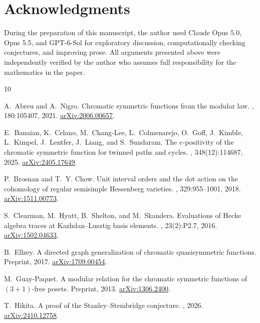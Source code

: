\documentclass[12pt]{article}
\theoremstyle{plain}
\theoremstyle{definition}
\theoremstyle{remark}
\begin{document}
\section{Acknowledgments}
During the preparation of this manuscript, the author used Claude Opus 5.0, Opus 5.5, and GPT-6-Sol for exploratory discussion, computationally checking conjectures, and improving prose. All arguments presented above were independently verified by the author who assumes full responsibility for the mathematics in the paper.
\begin{thebibliography}{10}

A.~Abreu and A.~Nigro.
\newblock Chromatic symmetric functions from the modular law.
, 180:105407, 2021.
\newblock \href{https://arxiv.org/abs/2006.00657}{arXiv:2006.00657}.

E.~Banaian, K.~Celano, M.~Chang-Lee, L.~Colmenarejo, O.~Goff, J.~Kimble, L.~Kimpel, J.~Lentfer, J.~Liang, and S.~Sundaram.
\newblock The $e$-positivity of the chromatic symmetric function for twinned paths and cycles.
, 348(12):114687, 2025.
\newblock \href{https://arxiv.org/abs/2405.17649}{arXiv:2405.17649}.

P.~Brosnan and T.~Y. Chow.
\newblock Unit interval orders and the dot action on the cohomology of regular semisimple {H}essenberg varieties.
, 329:955--1001, 2018.
\newblock \href{https://arxiv.org/abs/1511.00773}{arXiv:1511.00773}.

S.~Clearman, M.~Hyatt, B.~Shelton, and M.~Skandera.
\newblock Evaluations of {H}ecke algebra traces at {K}azhdan--{L}usztig basis elements.
, 23(2):P2.7, 2016.
\newblock \href{https://arxiv.org/abs/1502.04633}{arXiv:1502.04633}.

B.~Ellzey.
\newblock A directed graph generalization of chromatic quasisymmetric functions.
\newblock Preprint, 2017.
\newblock \href{https://arxiv.org/abs/1709.00454}{arXiv:1709.00454}.

M.~Guay-Paquet.
\newblock A modular relation for the chromatic symmetric functions of $(3+1)$-free posets.
\newblock Preprint, 2013.
\newblock \href{https://arxiv.org/abs/1306.2400}{arXiv:1306.2400}.

T.~Hikita.
\newblock A proof of the {S}tanley--{S}tembridge conjecture.
, 2026.
\newblock \href{https://arxiv.org/abs/2410.12758}{arXiv:2410.12758}.


\end{thebibliography}
\end{document}
